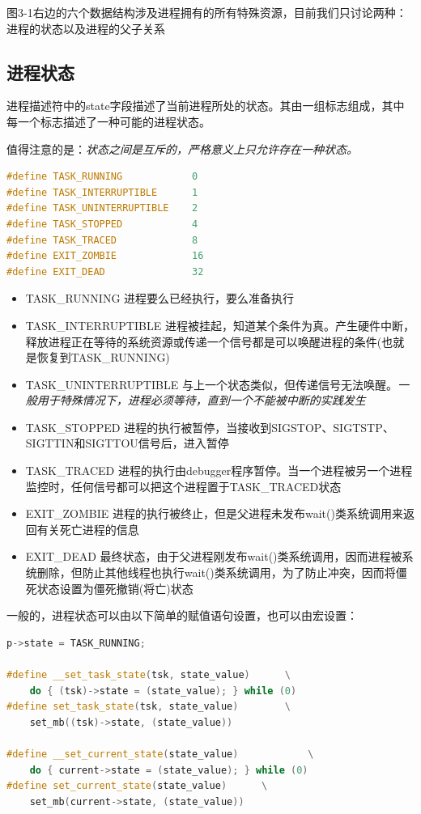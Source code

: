     图3-1右边的六个数据结构涉及进程拥有的所有特殊资源，目前我们只讨论两种：进程的状态以及进程的父子关系

\subsection{进程状态}

    进程描述符中的state字段描述了当前进程所处的状态。其由一组标志组成，其中每一个标志描述了一种可能的进程状态。

    值得注意的是：\emph{状态之间是互斥的，严格意义上只允许存在一种状态。}

\begin{lstlisting}[language=C++, caption={进程状态一览}]
#define TASK_RUNNING		    0
#define TASK_INTERRUPTIBLE	    1
#define TASK_UNINTERRUPTIBLE	2
#define TASK_STOPPED		    4
#define TASK_TRACED		        8
#define EXIT_ZOMBIE		        16
#define EXIT_DEAD		        32
\end{lstlisting}

\begin{itemize}
    \item TASK\_RUNNING
    \subitem 进程要么已经执行，要么准备执行
    \item TASK\_INTERRUPTIBLE
    \subitem 进程被挂起，知道某个条件为真。产生硬件中断，释放进程正在等待的系统资源或传递一个信号都是可以唤醒进程的条件(也就是恢复到TASK\_RUNNING)
    \item TASK\_UNINTERRUPTIBLE
    \subitem 与上一个状态类似，但传递信号无法唤醒。\emph{一般用于特殊情况下，进程必须等待，直到一个不能被中断的实践发生}
    \item TASK\_STOPPED
    \subitem 进程的执行被暂停，当接收到SIGSTOP、SIGTSTP、SIGTTIN和SIGTTOU信号后，进入暂停
    \item TASK\_TRACED
    \subitem 进程的执行由debugger程序暂停。当一个进程被另一个进程监控时，任何信号都可以把这个进程置于TASK\_TRACED状态
    \item EXIT\_ZOMBIE
    \subitem 进程的执行被终止，但是父进程未发布wait()类系统调用来返回有关死亡进程的信息
    \item EXIT\_DEAD
    \subitem 最终状态，由于父进程刚发布wait()类系统调用，因而进程被系统删除，但防止其他线程也执行wait()类系统调用，为了防止冲突，因而将僵死状态设置为僵死撤销(将亡)状态
\end{itemize}

    一般的，进程状态可以由以下简单的赋值语句设置，也可以由宏设置：

\begin{lstlisting}[language=C++]
p->state = TASK_RUNNING;

#define __set_task_state(tsk, state_value)		\
	do { (tsk)->state = (state_value); } while (0)
#define set_task_state(tsk, state_value)		\
	set_mb((tsk)->state, (state_value))

#define __set_current_state(state_value)			\
	do { current->state = (state_value); } while (0)
#define set_current_state(state_value)		\
	set_mb(current->state, (state_value))
\end{lstlisting}

